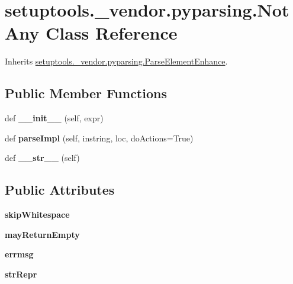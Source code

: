 \hypertarget{classsetuptools_1_1__vendor_1_1pyparsing_1_1_not_any}{}\section{setuptools.\+\_\+vendor.\+pyparsing.\+Not\+Any Class Reference}
\label{classsetuptools_1_1__vendor_1_1pyparsing_1_1_not_any}


Inherits \hyperlink{classsetuptools_1_1__vendor_1_1pyparsing_1_1_parse_element_enhance}{setuptools.\+\_\+vendor.\+pyparsing.\+Parse\+Element\+Enhance}.

\subsection*{Public Member Functions}
\begin{DoxyCompactItemize}
\item 
\mbox{\label{classsetuptools_1_1__vendor_1_1pyparsing_1_1_not_any_ad7c0c2e1d034bc70513e488b453615b5}} 
def {\bfseries \+\_\+\+\_\+init\+\_\+\+\_\+} (self, expr)
\item 
\mbox{\label{classsetuptools_1_1__vendor_1_1pyparsing_1_1_not_any_a5616d73be8c8300fb5d3797182c181ac}} 
def {\bfseries parse\+Impl} (self, instring, loc, do\+Actions=True)
\item 
\mbox{\label{classsetuptools_1_1__vendor_1_1pyparsing_1_1_not_any_a0804f162972e6573bac7acd41fa5f088}} 
def {\bfseries \+\_\+\+\_\+str\+\_\+\+\_\+} (self)
\end{DoxyCompactItemize}
\subsection*{Public Attributes}
\begin{DoxyCompactItemize}
\item 
\mbox{\label{classsetuptools_1_1__vendor_1_1pyparsing_1_1_not_any_a5dfba9562b71648992a7b6e839e41166}} 
{\bfseries skip\+Whitespace}
\item 
\mbox{\label{classsetuptools_1_1__vendor_1_1pyparsing_1_1_not_any_add7a6d02ddea84873067d731b1e4009a}} 
{\bfseries may\+Return\+Empty}
\item 
\mbox{\label{classsetuptools_1_1__vendor_1_1pyparsing_1_1_not_any_a690147669f455e71bdcb4744cbeff3e6}} 
{\bfseries errmsg}
\item 
\mbox{\label{classsetuptools_1_1__vendor_1_1pyparsing_1_1_not_any_ae897e111ba73e18c7c62a8515338bcf3}} 
{\bfseries str\+Repr}
\end{DoxyCompactItemize}

